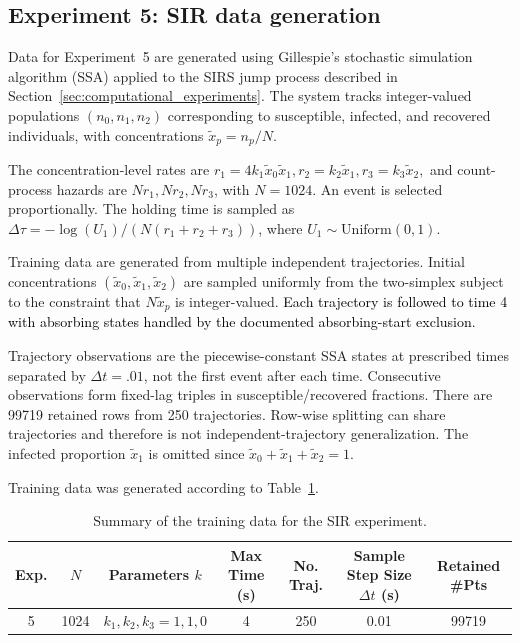 \subsection{Experiment 5: SIR data generation}

Data for Experiment~5 are generated using Gillespie's stochastic simulation algorithm (SSA) applied to the SIRS jump process described in Section~\ref{sec:computational_experiments}. The system tracks integer-valued populations $(n_0,n_1,n_2)$ corresponding to susceptible, infected, and recovered individuals, with concentrations $\tilde{x}_p = n_p/N$.

The concentration-level rates are $r_1 = 4k_1\tilde{x}_0\tilde{x}_1,
r_2 = k_2\tilde{x}_1,
r_3 = k_3\tilde{x}_2,$ and count-process hazards are $Nr_1,Nr_2,Nr_3$, with $N=1024$. An event is selected proportionally. The holding time is sampled as $\Delta \tau = -\log(U_1)/(N(r_1+r_2+r_3))$, where $ U_1\sim\mathrm{Uniform}(0,1)$.

Training data are generated from multiple independent trajectories. Initial concentrations $(\tilde{x}_0,\tilde{x}_1,\tilde{x}_2)$ are sampled uniformly from the two-simplex subject to the constraint that $N\tilde{x}_p$ is integer-valued. \textcolor{black}{Each trajectory is followed to time 4 with absorbing states handled by the documented absorbing-start exclusion.}

Trajectory observations are the piecewise-constant SSA states at prescribed times separated by $\Delta t=.01$, not the first event after each time. Consecutive observations form fixed-lag triples in susceptible/recovered fractions. There are 99719 retained rows from 250 trajectories. Row-wise splitting can share trajectories and therefore is not independent-trajectory generalization. The infected proportion $\tilde{x}_1$ is omitted since $\tilde{x}_0+\tilde{x}_1+\tilde{x}_2=1$.

Training data was generated according to Table~\ref{tab:SIR_training_data}.
\begin{table}[H]
\centering
\small
\caption{Summary of the training data for the SIR experiment.}
\label{tab:SIR_training_data}
\begin{tabular}{@{}c c c c c c c@{}}
\toprule
Exp. & $N$ & Parameters $k$ & Max Time (s)& No. Traj. & Sample Step Size $\Delta t$ (s)& Retained \#Pts \\
\midrule
5 & 1024 & $k_1,k_2,k_3 = 1,1,0$ & 4 & 250 & 0.01& 99719\\
\bottomrule
\end{tabular}
\end{table}

